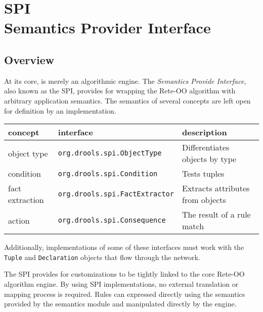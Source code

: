 \chapter[Semantics Provider Interface]{SPI\\\normalsize{Semantics Provider Interface}}

\section{Overview}

At its core, \drools{} is merely an algorithmic engine. The 
\emph{Semantics Provide Interface}, also known as the SPI,
provides for wrapping the \drools{} Rete-OO algorithm with
arbitrary application semantics. The semantics of several concepts are
left open for definition by an implementation.

\medskip

\begin{center}
  \begin{tabular}{|l|l|p{120pt}|}
    \hline
      \textsf{concept} & \textsf{interface} & \textsf{description} \\
    \hline
    \hline
      \footnotesize{object type} %
        & \texttt{\footnotesize{org.drools.spi.ObjectType}} %
        & \footnotesize{Differentiates objects by type} \\
    \hline
      \footnotesize{condition} %
        & \texttt{\footnotesize{org.drools.spi.Condition}} %
        & \footnotesize{Tests tuples}\\
    \hline
      \footnotesize{fact extraction} %
        & \texttt{\footnotesize{org.drools.spi.FactExtractor}} %
        & \footnotesize{Extracts attributes from objects} \\
    \hline
      \footnotesize{action} %
        & \texttt{\footnotesize{org.drools.spi.Consequence}} %
        & \footnotesize{The result of a rule match}\\
    \hline
  \end{tabular}
\end{center}

\medskip

Additionally, implementations of some of these interfaces must work
with the \verb|Tuple| and \verb|Declaration| objects that flow 
through the network.  

The SPI provides for \drools{} customizations to be tightly linked to
the core Rete-OO algorithm engine.  By using SPI implementations, no
external translation or mapping process is required.  Rules can
expressed directly using the semantics provided by the semantics module
and manipulated directly by the engine.

